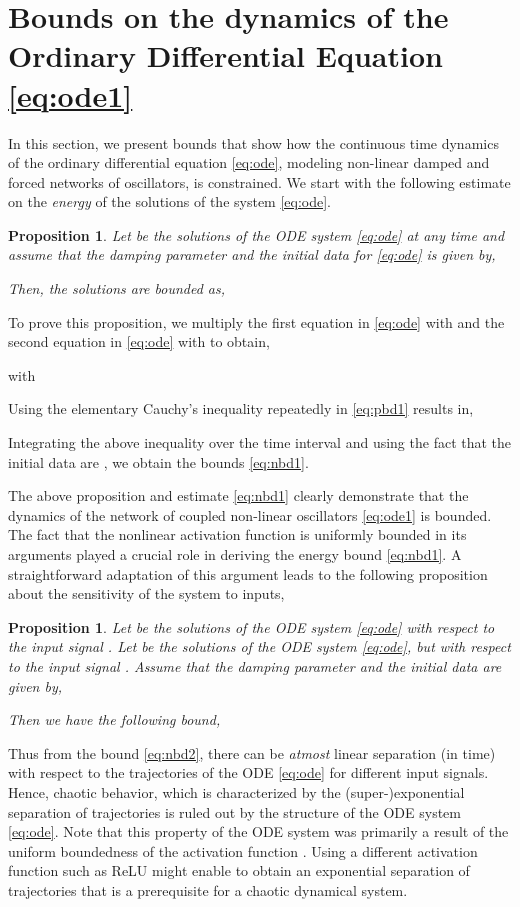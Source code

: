 \documentclass{article} \usepackage{iclr2021_conference,times}
\newtheorem{proposition}[theorem]{Proposition}
\begin{document}
\section{Bounds on the dynamics of the Ordinary Differential Equation \eqref{eq:ode1}}
\label{sec:bd}
In this section, we present bounds that show how the continuous time dynamics of the ordinary differential equation \eqref{eq:ode}, modeling non-linear damped and forced networks of oscillators, is constrained. We start with the following estimate on the \emph{energy} of the solutions of the system \eqref{eq:ode}. 
\begin{proposition}
\label{prop:n1}
Let  be the solutions of the ODE system \eqref{eq:ode} at any time  and assume that the damping parameter  and the initial data for \eqref{eq:ode} is given by,

Then, the solutions are bounded as,

\end{proposition}
To prove this proposition, we multiply the first equation in \eqref{eq:ode} with  and the second equation in \eqref{eq:ode} with  to obtain,

with 

Using the elementary Cauchy's inequality repeatedly in \eqref{eq:pbd1} results in,

Integrating the above inequality over the time interval  and using the fact that the initial data are , we obtain the bounds \eqref{eq:nbd1}.

The above proposition and estimate \eqref{eq:nbd1} clearly demonstrate that the dynamics of the network of coupled non-linear oscillators \eqref{eq:ode1} is bounded. The fact that the nonlinear activation function  is uniformly bounded in its arguments played a crucial role in deriving the energy bound \eqref{eq:nbd1}. A straightforward adaptation of this argument leads to the following proposition about the sensitivity of the system to inputs,
\begin{proposition}
\label{prop:n2}
Let  be the solutions of the ODE system \eqref{eq:ode} with respect to the input signal . Let   be the solutions of the ODE system \eqref{eq:ode}, but with respect to the input signal . Assume that the damping parameter  and the initial data are given by,

Then we have the following bound,

\end{proposition}
Thus from the bound \eqref{eq:nbd2}, there can be \emph{atmost} linear separation (in time) with respect to the trajectories of the ODE \eqref{eq:ode} for different input signals. Hence, chaotic behavior, which is characterized by the (super-)exponential separation of trajectories is ruled out by the structure of the ODE system \eqref{eq:ode}. Note that this property of the ODE system was primarily a result of the uniform boundedness of the activation function . Using a different activation function such as ReLU might enable to obtain an exponential separation of trajectories that is a prerequisite for a chaotic dynamical system.  
\end{document}
